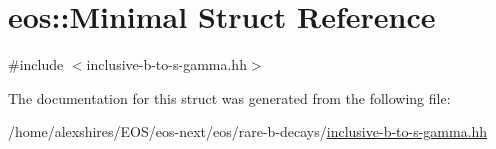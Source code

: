 \hypertarget{structeos_1_1Minimal}{
\section{eos::Minimal Struct Reference}
\label{structeos_1_1Minimal}
}


{\ttfamily \#include $<$inclusive-\/b-\/to-\/s-\/gamma.hh$>$}

The documentation for this struct was generated from the following file:\begin{DoxyCompactItemize}
\item 
/home/alexshires/EOS/eos-\/next/eos/rare-\/b-\/decays/\hyperlink{inclusive-b-to-s-gamma_8hh}{inclusive-\/b-\/to-\/s-\/gamma.hh}\end{DoxyCompactItemize}
